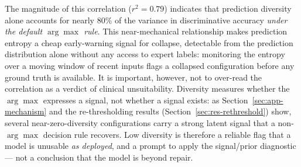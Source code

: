 The magnitude of this correlation ($r^2 = 0.79$) indicates that 
prediction diversity alone accounts for nearly $80\%$ of the variance 
in discriminative accuracy \emph{under the default $\arg\max$ rule}. 
This near-mechanical relationship makes prediction entropy a cheap 
early-warning signal for collapse, detectable from the prediction 
distribution alone without any access to expert labels: monitoring the 
entropy over a moving window of recent inputs flags a collapsed 
configuration before any ground truth is available. It is important, 
however, not to over-read the correlation as a verdict of clinical 
unsuitability. Diversity measures whether the $\arg\max$ expresses a 
signal, not whether a signal exists: as Section~\ref{sec:app-mechanism} 
and the re-thresholding results (Section~\ref{sec:res-rethreshold}) show, 
several near-zero-diversity configurations carry a strong latent signal 
that a non-$\arg\max$ decision rule recovers. Low diversity is therefore 
a reliable flag that a model is unusable \emph{as deployed}, and a 
prompt to apply the signal/prior diagnostic --- not a conclusion that 
the model is beyond repair.